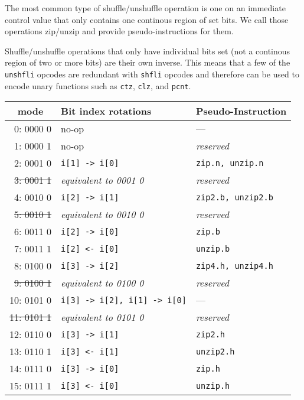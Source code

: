The most common type of shuffle/unshuffle operation is one on an immediate
control value that only contains one continous region of set bits. We call
those operations zip/unzip and provide pseudo-instructions for them.

Shuffle/unshuffle operations that only have individual bits set (not a continous
region of two or more bits) are their own inverse. This means that a few of the
{\tt unshfli} opcodes are redundant with {\tt shfli} opcodes and therefore can
be used to encode unary functions such as {\tt ctz}, {\tt clz}, and {\tt pcnt}.

\begin{table}[h]
\begin{small}
\begin{center}
\begin{tabular}{r l l}
\multicolumn{1}{c}{mode} &
Bit index rotations &
Pseudo-Instruction \\

\hline

       0: 0000 0  & no-op                            & ---                    \\
       1: 0000 1  & no-op                            & {\it reserved}         \\
       2: 0001 0  & {\tt i[1] -> i[0]}               & {\tt zip.n, unzip.n}   \\
\sout{ 3: 0001 1} & {\it equivalent to 0001 0}       & {\it reserved}         \\
       4: 0010 0  & {\tt i[2] -> i[1]}               & {\tt zip2.b, unzip2.b} \\
\sout{ 5: 0010 1} & {\it equivalent to 0010 0}       & {\it reserved}         \\
       6: 0011 0  & {\tt i[2] -> i[0]}               & {\tt zip.b}            \\
       7: 0011 1  & {\tt i[2] <- i[0]}               & {\tt unzip.b}          \\

\hline

       8: 0100 0  & {\tt i[3] -> i[2]}               & {\tt zip4.h, unzip4.h} \\
\sout{ 9: 0100 1} & {\it equivalent to 0100 0}       & {\it reserved}         \\
      10: 0101 0  & {\tt i[3] -> i[2], i[1] -> i[0]} & ---                    \\
\sout{11: 0101 1} & {\it equivalent to 0101 0}       & {\it reserved}         \\
      12: 0110 0  & {\tt i[3] -> i[1]}               & {\tt zip2.h}           \\
      13: 0110 1  & {\tt i[3] <- i[1]}               & {\tt unzip2.h}         \\
      14: 0111 0  & {\tt i[3] -> i[0]}               & {\tt zip.h}            \\
      15: 0111 1  & {\tt i[3] <- i[0]}               & {\tt unzip.h}          \\


\end{tabular}
\end{center}
\end{small}
\end{table}
